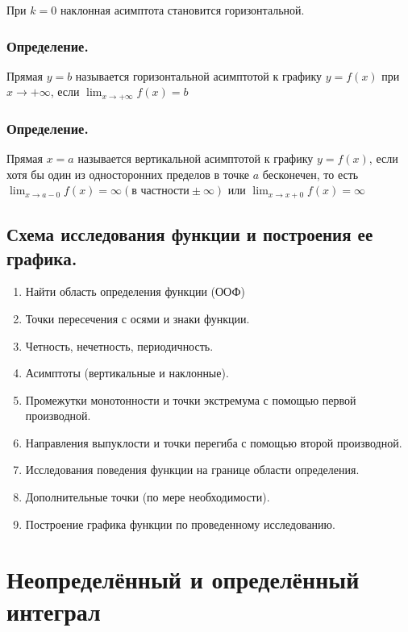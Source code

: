 \documentclass[a4paper,12pt]{article}
\theoremstyle{plain} %
\theoremstyle{definition} %
\theoremstyle{remark} %
\begin{document}
При $k = 0$ наклонная асимптота становится горизонтальной.

\subsubsection*{Определение.}
Прямая $y = b$ называется горизонтальной асимптотой к графику $y = f(x)$ при $x \rightarrow +\infty$, если $\lim_{x \rightarrow +\infty} f(x) = b$

\subsubsection*{Определение.}
Прямая $x = a$ называется вертикальной асимптотой к графику $y = f(x)$, если хотя бы один из односторонних пределов в точке $a$ бесконечен, то есть $\lim_{x \rightarrow a - 0}f(x) = \infty (\text{в частности} \pm \infty)$ или $\lim_{x \rightarrow x + 0}f(x) = \infty$



\newpage
\subsection*{Схема исследования функции и построения ее графика.                                                      }

\begin{enumerate}
	\item Найти область определения функции (ООФ)
	\item Точки пересечения с осями и знаки функции.
	\item Четность, нечетность, периодичность.
	\item Асимптоты (вертикальные и наклонные).
	\item Промежутки монотонности и точки экстремума с помощью первой производной.
	\item Направления выпуклости и точки перегиба с помощью второй производной.
	\item Исследования поведения функции на границе области определения.
	\item Дополнительные точки (по мере необходимости).
	\item Построение графика функции по проведенному исследованию.
\end{enumerate}



\newpage
\section*{Неопределённый и определённый интеграл}
\end{document}
